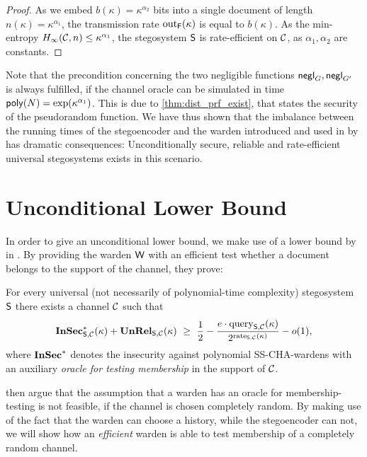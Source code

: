 \begin{proof}
As we embed $b(\kappa)= \kappa^{\alpha_{2}}$ bits into a single document
of length $n(\kappa)=\kappa^{\alpha_{1}}$, the
transmission rate $\operatorname{out}_{\operatorname{\mathsf{F}}}(\kappa)$ is equal to $b(\kappa)$.  As
the min-entropy
$H_{\infty}(\mathcal{C},n)\leq \kappa^{\alpha_{1}}$, the
stegosystem $\operatorname{\mathsf{S}}$ is rate-efficient on $\mathcal{C}$, as
$\alpha_{1},\alpha_{2}$ are constants.
 \end{proof}


Note that the precondition concerning the two negligible functions
$\operatorname{\mathsf{negl}}_{G},\operatorname{\mathsf{negl}}_{G'}$ is always fulfilled, if the channel oracle can be
simulated in time $\operatorname{\mathsf{poly}}(N)=\exp(\kappa^{\alpha_{1}})$. This is due to
\autoref{thm:dist_prf_exist}, that states the security of the
pseudorandom function. We have thus shown that the imbalance between the
running times of the stegoencoder and the warden introduced and used in
\cite{hopper2009provably} by \citeauthor{hopper2009provably} has
dramatic consequences: Unconditionally secure, reliable and rate-efficient universal
stegosystems exists in this scenario.

\section{Unconditional Lower Bound}
\label{sec:lower_bound}
In order to give an unconditional lower bound, we make use of a lower
bound by \citeauthor{dedic2009lower} in \cite{dedic2009lower}. By providing the warden $\operatorname{\mathsf{W}}$
with an efficient test whether a document belongs to the support of the
channel, they prove:

\begin{theorem}
\label{thm:lower_bound}
  For every universal (not necessarily of polynomial-time complexity)
  stegosystem $\operatorname{\mathsf{S}}$  there exists a  channel $\mathcal{C}$ such that  
  \begin{align*}
    \InSec^{*}_{\Steg,\chan}(\kappa) + \unrel_{\Steg,\chan}(\kappa) \ \ge \ 
       \frac{1}{2} - \frac{e\cdot \query_{\Steg,\chan}(\kappa)}{2^{\rate_{\Steg,\chan}(\kappa)}} -o(1),    
  \end{align*}
  where $\operatorname{\mathbf{InSec}}^{*}$ denotes the insecurity against polynomial \ac{SS-CHA}-wardens with
  an auxiliary \emph{oracle for testing membership} in the support of $\mathcal{C}$.

\end{theorem}
\citeauthor{dedic2009lower} then argue that the assumption that a warden has an oracle
for membership-testing is not feasible, if the channel is chosen
completely random. By making use of the fact that the warden can
choose a history, while the stegoencoder can not, we will show how an
\emph{efficient} warden is able to test membership of a completely
random channel.

